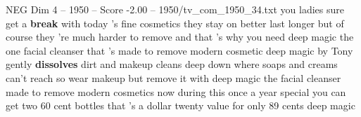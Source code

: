 \begin{textsample}{NEG Dim 4 – 1950 – Score -2.00 – 1950/tv\_com\_1950\_34.txt}  \label{ex:f4_neg_014}
you ladies sure get a \textbf{break} with today 's fine cosmetics they stay on better last longer but of course they 're much harder to remove and that 's why you need deep magic the one facial cleanser that 's made to remove modern cosmetic deep magic by Tony gently \textbf{dissolves} dirt and makeup cleans deep down where soaps and creams can't reach so wear makeup but remove it with deep magic the facial cleanser made to remove modern cosmetics now during this once a year special you can get two 60 cent bottles that 's a dollar twenty value for only 89 cents deep magic

\end{textsample}

